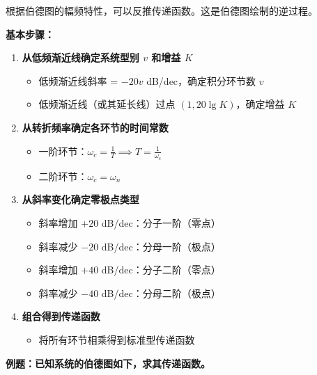 根据伯德图的幅频特性，可以反推传递函数。这是伯德图绘制的逆过程。

\textbf{基本步骤：}
\begin{enumerate}
    \item \textbf{从低频渐近线确定系统型别 $v$ 和增益 $K$}
    \begin{itemize}
        \item 低频渐近线斜率 = $-20v$ dB/dec，确定积分环节数 $v$
        \item 低频渐近线（或其延长线）过点 $(1, 20\lg K)$，确定增益 $K$
    \end{itemize}
    
    \item \textbf{从转折频率确定各环节的时间常数}
    \begin{itemize}
        \item 一阶环节：$\omega_c = \frac{1}{T} \implies T = \frac{1}{\omega_c}$
        \item 二阶环节：$\omega_c = \omega_n$
    \end{itemize}
    
    \item \textbf{从斜率变化确定零极点类型}
    \begin{itemize}
        \item 斜率增加 $+20$ dB/dec：分子一阶（零点）
        \item 斜率减少 $-20$ dB/dec：分母一阶（极点）
        \item 斜率增加 $+40$ dB/dec：分子二阶（零点）
        \item 斜率减少 $-40$ dB/dec：分母二阶（极点）
    \end{itemize}
    
    \item \textbf{组合得到传递函数}
    \begin{itemize}
        \item 将所有环节相乘得到标准型传递函数
    \end{itemize}
\end{enumerate}

\textbf{例题：已知系统的伯德图如下，求其传递函数。}

